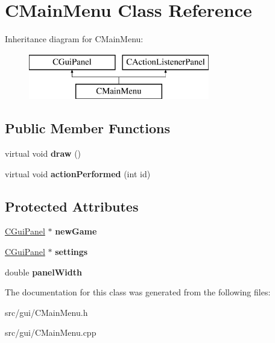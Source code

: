\hypertarget{class_c_main_menu}{
\section{CMainMenu Class Reference}
\label{class_c_main_menu}
}
Inheritance diagram for CMainMenu:\begin{figure}[H]
\begin{center}
\leavevmode
\includegraphics[height=2.000000cm]{class_c_main_menu}
\end{center}
\end{figure}
\subsection*{Public Member Functions}
\begin{DoxyCompactItemize}
\item 
\hypertarget{class_c_main_menu_a8591835e8b7d3514977b26eb442c81c8}{
virtual void {\bfseries draw} ()}
\label{class_c_main_menu_a8591835e8b7d3514977b26eb442c81c8}

\item 
\hypertarget{class_c_main_menu_ad5c15cb06e72a4d29eb9fb6f6e661e39}{
virtual void {\bfseries actionPerformed} (int id)}
\label{class_c_main_menu_ad5c15cb06e72a4d29eb9fb6f6e661e39}

\end{DoxyCompactItemize}
\subsection*{Protected Attributes}
\begin{DoxyCompactItemize}
\item 
\hypertarget{class_c_main_menu_a5e21dd2a3bcefaabe9c28701c8ccb224}{
\hyperlink{class_c_gui_panel}{CGuiPanel} $\ast$ {\bfseries newGame}}
\label{class_c_main_menu_a5e21dd2a3bcefaabe9c28701c8ccb224}

\item 
\hypertarget{class_c_main_menu_ad37150ce5163b9e3981924494726dae6}{
\hyperlink{class_c_gui_panel}{CGuiPanel} $\ast$ {\bfseries settings}}
\label{class_c_main_menu_ad37150ce5163b9e3981924494726dae6}

\item 
\hypertarget{class_c_main_menu_a3a06b14fa57be2ac155e6f2ceddecf90}{
double {\bfseries panelWidth}}
\label{class_c_main_menu_a3a06b14fa57be2ac155e6f2ceddecf90}

\end{DoxyCompactItemize}


The documentation for this class was generated from the following files:\begin{DoxyCompactItemize}
\item 
src/gui/CMainMenu.h\item 
src/gui/CMainMenu.cpp\end{DoxyCompactItemize}
